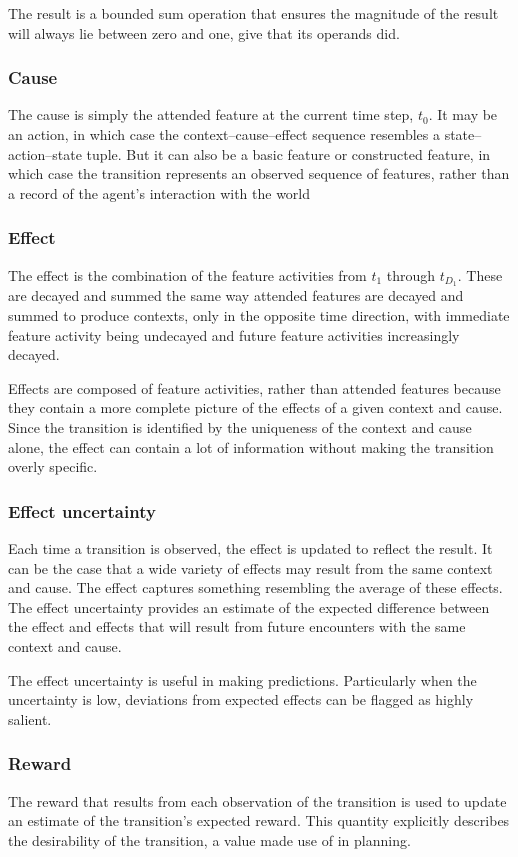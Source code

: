 The result is a bounded sum operation that ensures the magnitude of the result will always lie between zero and one, give that its operands did.


\subsubsection{Cause}
The cause is simply the attended feature at the current time step, $t_0$. It may be an action, in which case the context--cause--effect sequence resembles a state--action--state tuple. But it can also be a basic feature or constructed feature, in which case the transition represents an observed sequence of features, rather than a record of the agent's interaction with the world

\subsubsection{Effect}
The effect is the combination of the feature activities from $t_1$ through $t_{D_1}$. These are decayed and summed the same way attended features are decayed and summed to produce contexts, only in the opposite time direction, with immediate feature activity being undecayed and future feature activities increasingly decayed. 

Effects are composed of feature activities, rather than attended features because they contain a more complete picture of the effects of a given context and cause. Since the transition is identified by the uniqueness of the context and cause alone, the effect can contain a lot of information without making the transition overly specific. 

\subsubsection{Effect uncertainty}
Each time a transition is observed, the effect is updated to reflect the result. It can be the case that a wide variety of effects may result from the same context and cause. The effect captures something resembling the average of these effects. The effect uncertainty provides an estimate of the expected difference between the effect and effects that will result from future encounters with the same context and cause. 

The effect uncertainty is useful in making predictions. Particularly when the uncertainty is low, deviations from expected effects can be flagged as highly salient.

\subsubsection{Reward}
The reward that results from each observation of the transition is used to update an estimate of the transition's expected reward. This quantity explicitly describes the desirability of the transition, a value made use of in planning.

